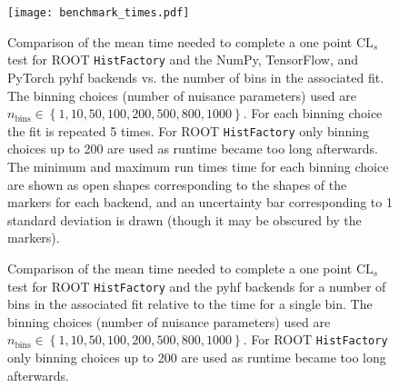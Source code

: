 \begin{figure}
 \centering
 \texttt{[image: benchmark\_times.pdf]}
 \caption{Comparison of the mean time needed to complete a one point $\text{CL}_{s}$ test for ROOT \texttt{HistFactory} and the NumPy, TensorFlow, and PyTorch pyhf backends vs. the number of bins in the associated fit.
  The binning choices (number of nuisance parameters) used are $n_{\text{bins}} \in \left\{1, 10, 50, 100, 200, 500, 800, 1000\right\}$.
  For each binning choice the fit is repeated 5 times.
  For ROOT \texttt{HistFactory} only binning choices up to 200 are used as runtime became too long afterwards.
  The minimum and maximum run times time for each binning choice are shown as open shapes corresponding to the shapes of the markers for each backend, and an uncertainty bar corresponding to 1 standard deviation is drawn (though it may be obscured by the markers).
 }\label{fig:benchmark_backends}
\end{figure}

\begin{figure}[htbp]
 \centering
 \hfil
 \hfil
 \caption{Comparison of the mean time needed to complete a one point $\text{CL}_{s}$ test for ROOT \texttt{HistFactory} and the pyhf backends for a number of bins in the associated fit relative to the time for a single bin.
  The binning choices (number of nuisance parameters) used are $n_{\text{bins}} \in \left\{1, 10, 50, 100, 200, 500, 800, 1000\right\}$.
  For ROOT \texttt{HistFactory} only binning choices up to 200 are used as runtime became too long afterwards.
 }\label{fig:relative_time}
\end{figure}
